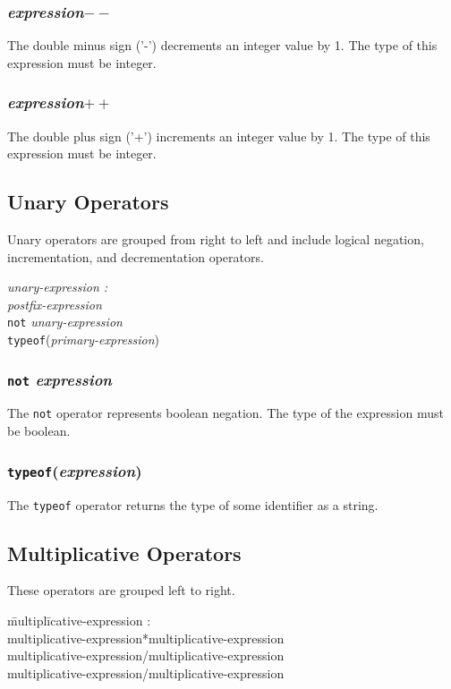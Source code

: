 \documentclass{article}
\begin{document}
\subsubsection{\emph{expression}$--$}
The double minus sign ('-') decrements an integer value by 1. The type of this expression must be integer.
\subsubsection{\emph{expression}$++$}
The double plus sign ('+') increments an integer value by 1. The type of this expression must be integer.

\subsection{Unary Operators}
Unary operators are grouped from right to left and include logical negation, incrementation, and decrementation operators.
\begin{tabbing}
	\= \emph{una}\=\emph{ry-expression :} \\
		\> \> \emph{postfix-expression} \\
		\>\> \texttt{not} \emph{unary-expression}\\
		\>\> \texttt{typeof}(\emph{primary-expression})
\end{tabbing}

\subsubsection{\texttt{not} \emph{expression}}
The \texttt{not} operator represents boolean negation. The type of the expression must be boolean.

\subsubsection{\texttt{typeof}(\emph{expression})}
The \texttt{typeof} operator returns the type of some identifier as a string.

\subsection{Multiplicative Operators}
These operators are grouped left to right.
\begin{itshape}
\begin{tabbing}
	\= multipl\=icative-expression : \\
		\>\> multiplicative-expression*multiplicative-expression \\		
		\>\> multiplicative-expression/multiplicative-expression \\
		\>\> multiplicative-expression/multiplicative-expression
\end{tabbing}
\end{itshape}
\end{document}
